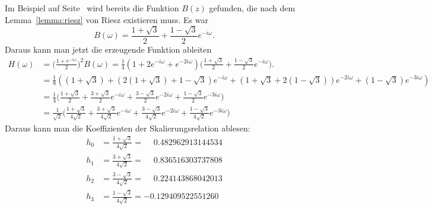 Im Beispiel auf Seite~\pageref{buch:kompakt:db2riesz} wird bereits
die Funktion $B(z)$ gefunden, die nach dem Lemma~\ref{lemma:riesz}
von Riesz existieren muss.
Es war
\[
B(\omega)
=
\frac{1+\sqrt{3}}2 + \frac{1-\sqrt{3}}2e^{-i\omega}.
\]
Daraus kann man jetzt die erzeugende Funktion ableiten
\begin{align*}
H(\omega)
&=
\biggl(\frac{1+e^{-i\omega}}2\biggr)^2 B(\omega)
=
\frac14(1+2e^{-i\omega}+e^{-2i\omega})
\biggl(
\frac{1+\sqrt{3}}2 + \frac{1-\sqrt{3}}2e^{-i\omega}
\biggr).
\\
&=
\frac18(
(1+\sqrt{3})
+
(2(1+\sqrt{3})+1-\sqrt{3}) e^{-i\omega}
+
(1+\sqrt{3}+2(1-\sqrt{3})) e^{-2i\omega}
+
(1-\sqrt{3})e^{-3i\omega}
)
\\
&=
\frac14\biggl(
\frac{1+\sqrt{3}}2
+
\frac{3+\sqrt{3}}2 e^{-i\omega}
+
\frac{3-\sqrt{3}}2 e^{-2i\omega}
+
\frac{1-\sqrt{3}}2 e^{-3i\omega}
\biggr)
\\
&=
\frac1{\sqrt{2}}
\biggl(
\frac{1+\sqrt{3}}{4\sqrt{2}}
+
\frac{3+\sqrt{3}}{4\sqrt{2}} e^{-i\omega}
+
\frac{3-\sqrt{3}}{4\sqrt{2}} e^{-2i\omega}
+
\frac{1-\sqrt{3}}{4\sqrt{2}} e^{-3i\omega}
\biggr)
\end{align*}
Daraus kann man die Koeffizienten der Skalierungsrelation ablesen:
\begin{align*}
h_0
&=
\frac{1+\sqrt{3}}{4\sqrt{2}}
=
\phantom{-}
0.482962913144534
\\
h_1
&=
\frac{3+\sqrt{3}}{4\sqrt{2}}
=
\phantom{-}
0.836516303737808
\\
h_2
&=
\frac{3-\sqrt{3}}{4\sqrt{2}}
=
\phantom{-}
0.224143868042013
\\
h_3
&=
\frac{1-\sqrt{3}}{4\sqrt{2}}
=
-0.129409522551260
\end{align*}


